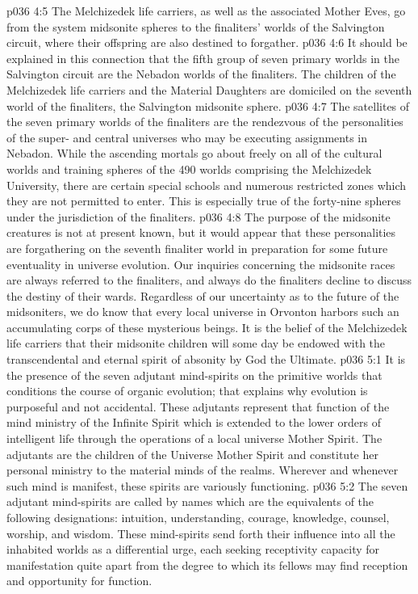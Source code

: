 \pc \vs p036 4:5  The Melchizedek life carriers, as well as the associated Mother Eves, go from the system midsonite spheres to the finaliters’ worlds of the Salvington circuit, where their offspring are also destined to forgather.
\vs p036 4:6 It should be explained in this connection that the fifth group of seven primary worlds in the Salvington circuit are the Nebadon worlds of the finaliters. The children of the Melchizedek life carriers and the Material Daughters are domiciled on the seventh world of the finaliters, the Salvington midsonite sphere.
\vs p036 4:7 The satellites of the seven primary worlds of the finaliters are the rendezvous of the personalities of the super\hyp{} and central universes who may be executing assignments in Nebadon. While the ascending mortals go about freely on all of the cultural worlds and training spheres of the 490 worlds comprising the Melchizedek University, there are certain special schools and numerous restricted zones which they are not permitted to enter. This is especially true of the forty\hyp{}nine spheres under the jurisdiction of the finaliters.
\pc \vs p036 4:8 The purpose of the midsonite creatures is not at present known, but it would appear that these personalities are forgathering on the seventh finaliter world in preparation for some future eventuality in universe evolution. Our inquiries concerning the midsonite races are always referred to the finaliters, and always do the finaliters decline to discuss the destiny of their wards. Regardless of our uncertainty as to the future of the midsoniters, we do know that every local universe in Orvonton harbors such an accumulating corps of these mysterious beings. It is the belief of the Melchizedek life carriers that their midsonite children will some day be endowed with the transcendental and eternal spirit of absonity by God the Ultimate.
\vs p036 5:1 It is the presence of the seven adjutant mind\hyp{}spirits on the primitive worlds that conditions the course of organic evolution; that explains why evolution is purposeful and not accidental. These adjutants represent that function of the mind ministry of the Infinite Spirit which is extended to the lower orders of intelligent life through the operations of a local universe Mother Spirit. The adjutants are the children of the Universe Mother Spirit and constitute her personal ministry to the material minds of the realms. Wherever and whenever such mind is manifest, these spirits are variously functioning.
\vs p036 5:2 The seven adjutant mind\hyp{}spirits are called by names which are the equivalents of the following designations: intuition, understanding, courage, knowledge, counsel, worship, and wisdom. These mind\hyp{}spirits send forth their influence into all the inhabited worlds as a differential urge, each seeking receptivity capacity for manifestation quite apart from the degree to which its fellows may find reception and opportunity for function.
